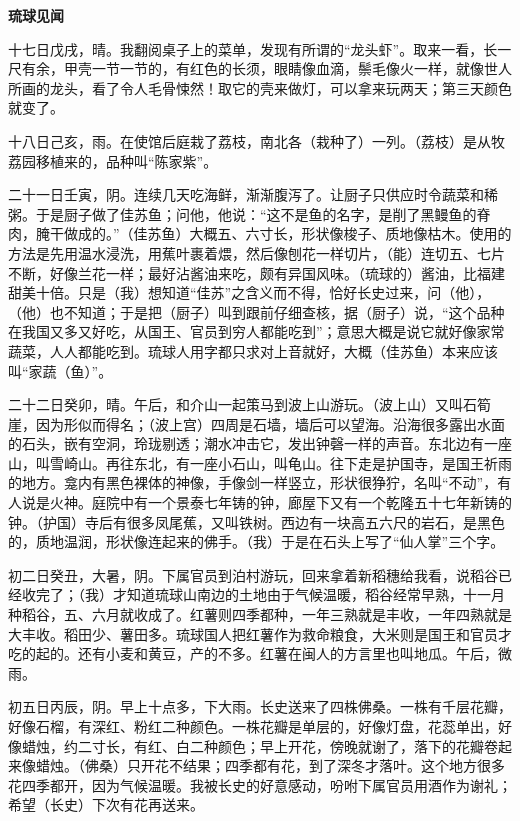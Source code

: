 \documentclass[12pt,UTF-8,openany,a4]{ctexbook}
\begin{document}
\begin{large}
    \begin{center}{\Large\textbf{琉球见闻}}\end{center}
    
    十七日戊戌，晴。我翻阅桌子上的菜单，发现有所谓的“龙头虾”。取来一看，长一尺有余，甲壳一节一节的，有红色的长须，眼睛像血滴，鬃毛像火一样，就像世人所画的龙头，看了令人毛骨悚然！取它的壳来做灯，可以拿来玩两天；第三天颜色就变了。
    
    十八日己亥，雨。在使馆后庭栽了荔枝，南北各（栽种了）一列。（荔枝）是从牧荔园移植来的，品种叫“陈家紫”。
    
    二十一日壬寅，阴。连续几天吃海鲜，渐渐腹泻了。让厨子只供应时令蔬菜和稀粥。于是厨子做了佳苏鱼；问他，他说：“这不是鱼的名字，是削了黑鳗鱼的脊肉，腌干做成的。”（佳苏鱼）大概五、六寸长，形状像梭子、质地像枯木。使用的方法是先用温水浸洗，用蕉叶裹着煨，然后像刨花一样切片，（能）连切五、七片不断，好像兰花一样；最好沾酱油来吃，颇有异国风味。（琉球的）酱油，比福建甜美十倍。只是（我）想知道“佳苏”之含义而不得，恰好长史过来，问（他），（他）也不知道；于是把（厨子）叫到跟前仔细查核，据（厨子）说，“这个品种在我国又多又好吃，从国王、官员到穷人都能吃到”；意思大概是说它就好像家常蔬菜，人人都能吃到。琉球人用字都只求对上音就好，大概（佳苏鱼）本来应该叫“家蔬（鱼）”。
    
    二十二日癸卯，晴。午后，和介山一起策马到波上山游玩。（波上山）又叫石筍崖，因为形似而得名；（波上宫）四周是石墙，墙后可以望海。沿海很多露出水面的石头，嵌有空洞，玲珑剔透；潮水冲击它，发出钟磬一样的声音。东北边有一座山，叫雪崎山。再往东北，有一座小石山，叫龟山。往下走是护国寺，是国王祈雨的地方。龛内有黑色裸体的神像，手像剑一样竖立，形状很狰狞，名叫“不动”，有人说是火神。庭院中有一个景泰七年铸的钟，廊屋下又有一个乾隆五十七年新铸的钟。（护国）寺后有很多凤尾蕉，又叫铁树。西边有一块高五六尺的岩石，是黑色的，质地温润，形状像连起来的佛手。（我）于是在石头上写了“仙人掌”三个字。
    
    初二日癸丑，大暑，阴。下属官员到泊村游玩，回来拿着新稻穗给我看，说稻谷已经收完了；（我）才知道琉球山南边的土地由于气候温暖，稻谷经常早熟，十一月种稻谷，五、六月就收成了。红薯则四季都种，一年三熟就是丰收，一年四熟就是大丰收。稻田少、薯田多。琉球国人把红薯作为救命粮食，大米则是国王和官员才吃的起的。还有小麦和黄豆，产的不多。红薯在闽人的方言里也叫地瓜。午后，微雨。
    
    初五日丙辰，阴。早上十点多，下大雨。长史送来了四株佛桑。一株有千层花瓣，好像石榴，有深红、粉红二种颜色。一株花瓣是单层的，好像灯盘，花蕊单出，好像蜡烛，约二寸长，有红、白二种颜色；早上开花，傍晚就谢了，落下的花瓣卷起来像蜡烛。（佛桑）只开花不结果；四季都有花，到了深冬才落叶。这个地方很多花四季都开，因为气候温暖。我被长史的好意感动，吩咐下属官员用酒作为谢礼；希望（长史）下次有花再送来。
    

\end{large}
\end{document}
